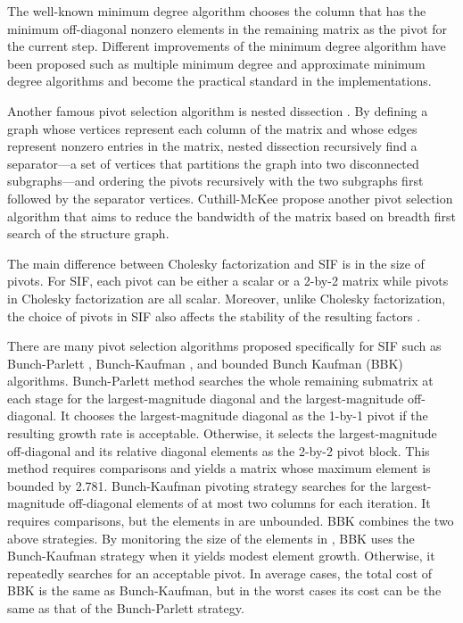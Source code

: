 \documentclass{article}
\begin{document}
The well-known minimum degree algorithm \cite{MD1} chooses the column that has the minimum off-diagonal nonzero elements in the remaining matrix as the pivot for the current step.  
Different improvements of the minimum degree algorithm have been proposed \cite{MDevol} such as multiple minimum degree \cite{MMD1} and approximate minimum degree algorithms \cite{AMD1} and become the practical standard in the implementations.

Another famous pivot selection algorithm is nested dissection \cite{ND}.  By defining a graph whose vertices represent each column of the matrix and whose edges represent nonzero entries in the matrix, nested dissection recursively find a separator---a set of vertices that partitions the graph into two disconnected subgraphs---and ordering the pivots recursively with the two subgraphs first followed by the separator vertices.  Cuthill-McKee \cite{CM} propose another pivot selection algorithm that aims to reduce the bandwidth of the matrix based on breadth first search of the  structure graph.

The main difference between Cholesky factorization and SIF is in the size of pivots.  For SIF, each pivot can be either a scalar or a 2-by-2 matrix while pivots in Cholesky factorization are all scalar.
Moreover, unlike Cholesky factorization, the choice of pivots in SIF also affects the stability of the resulting factors \cite{SIF1}.

There are many pivot selection algorithms proposed specifically for SIF such as 
Bunch-Parlett \cite{BP}, Bunch-Kaufman \cite{BK}, and bounded Bunch Kaufman (BBK) \cite{BBK} algorithms.
Bunch-Parlett method searches the whole remaining submatrix at each stage for the largest-magnitude diagonal and the largest-magnitude off-diagonal.  It chooses the largest-magnitude diagonal as the 1-by-1 pivot if the resulting growth rate is acceptable.  Otherwise, it selects the largest-magnitude off-diagonal and its relative diagonal elements as the 2-by-2 pivot block. 
This method requires  comparisons and yields a matrix   whose maximum element is bounded by 2.781.
Bunch-Kaufman pivoting strategy searches for the largest-magnitude off-diagonal elements of at most two columns for each iteration. It requires  comparisons, but the elements in  are unbounded. 
BBK combines the two above strategies.  By monitoring the size of the elements in , BBK uses the Bunch-Kaufman strategy when it yields modest element growth. Otherwise, it repeatedly searches for an acceptable pivot.
In average cases, the total cost of BBK is the same as Bunch-Kaufman, but in the worst cases its cost can be the same as that of the Bunch-Parlett strategy.  
\end{document}
